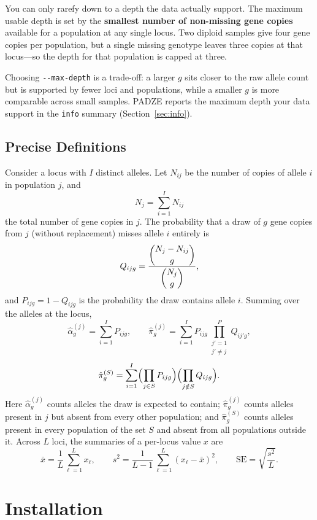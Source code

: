 \documentclass[11pt]{article}
\newcommand{\padze}{PADZE}
\begin{document}
You can only rarefy down to a depth the data actually support. The maximum usable
depth is set by the \textbf{smallest number of non-missing gene copies}
available for a population at any single locus. Two diploid samples give four
gene copies per population, but a single missing genotype leaves three copies at
that locus---so the depth for that population is capped at three.

Choosing \texttt{-{}-max-depth} is a trade-off: a larger \(g\) sits closer to the
raw allele count but is supported by fewer loci and populations, while a smaller
\(g\) is more comparable across small samples. \padze{} reports the maximum depth
your data support in the \texttt{info} summary (Section~\ref{sec:info}).

\subsection{Precise Definitions}
\label{sec:defs}

Consider a locus with \(I\) distinct alleles. Let \(N_{ij}\) be the number of
copies of allele \(i\) in population \(j\), and
\[
  N_j = \sum_{i=1}^{I} N_{ij}
\]
the total number of gene copies in \(j\). The probability that a draw of \(g\)
gene copies from \(j\) (without replacement) misses allele \(i\) entirely is
\[
  Q_{ijg} = \frac{\dbinom{N_j - N_{ij}}{g}}{\dbinom{N_j}{g}},
\]
and \(P_{ijg} = 1 - Q_{ijg}\) is the probability the draw contains allele \(i\).
Summing over the alleles at the locus,
\[
  \hat{\alpha}^{(j)}_g = \sum_{i=1}^{I} P_{ijg},
\qquad
  \hat{\pi}^{(j)}_g = \sum_{i=1}^{I} P_{ijg}\!\!\prod_{\substack{j'=1\\ j' \ne j}}^{P}\!\! Q_{ij'g},
\]
\[
  \hat{\pi}^{(S)}_g = \sum_{i=1}^{I}
  \Bigl(\prod_{j \in S} P_{ijg}\Bigr)
  \Bigl(\prod_{j \notin S} Q_{ijg}\Bigr).
\]
Here \(\hat{\alpha}^{(j)}_g\) counts alleles the draw is expected to contain;
\(\hat{\pi}^{(j)}_g\) counts alleles present in \(j\) but absent from every other
population; and \(\hat{\pi}^{(S)}_g\) counts alleles present in every population
of the set \(S\) and absent from all populations outside it. Across \(L\) loci,
the summaries of a per-locus value \(x\) are
\[
  \bar{x} = \frac{1}{L}\sum_{\ell=1}^{L} x_{\ell},
\qquad
  s^2 = \frac{1}{L-1}\sum_{\ell=1}^{L}(x_{\ell}-\bar{x})^2,
\qquad
  \mathrm{SE} = \sqrt{\frac{s^2}{L}}.
\]

\section{Installation}
\label{sec:install}
\end{document}
